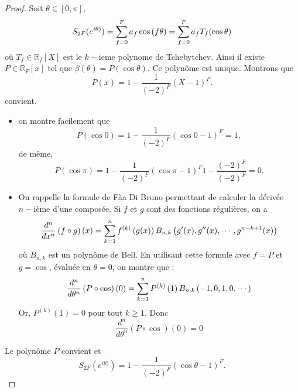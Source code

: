 \begin{proof}
Soit $\theta \in [0, \pi]$, 
\begin{equation}
S_{2F}(e^{i\theta)}) = \displaystyle\sum\limits_{f=0}^F a_f \cos \left( f \theta \right) = \displaystyle\sum\limits_{f=0}^F a_f T_f ( \cos \theta )
\end{equation}
où $T_f \in \mathbb{R}_f [X]$ est le $k-$ieme polynome de Tchebytchev. 
Ainsi il existe $P \in \mathbb{R}_F [x]$ tel que $\beta( \theta ) = P( \cos \theta )$. Ce polynôme est unique. Montrons que 
\begin{equation}
P(x) = 1 -\dfrac{1}{(-2)^F} (X - 1)^F.
\end{equation}
convient.

\begin{itemize}
\item on montre facilement que 
\begin{equation}
P( \cos 0 ) = 1 -\dfrac{1}{(-2)^F} (\cos 0 - 1)^F = 1,
\end{equation}
de même,
\begin{equation}
P( \cos \pi ) = 1 -\dfrac{1}{(-2)^F} (\cos \pi - 1)^F 1 -\dfrac{(-2)^F}{(-2)^F} = 0.
\end{equation}
\item On rappelle la formule de Fàa Di Bruno permettant de calculer la dérivée $n-$ième d'une composée. Si $f$ et $g$ sont des fonctions régulières, on a 
\begin{equation}
\dfrac{d^n}{dx^n} \left( f \circ g \right)(x) = \displaystyle\sum\limits_{k=1}^n f^{(k)}\left( g(x) \right) B_{n,k}\left( g'(x), g''(x), \cdots , g^{n-k+1}(x) \right)
\end{equation}
où $B_{n,k}$ est un polynôme de Bell. En utilisant cette formule avec $f = P$ et $g = \cos$, évaluée en $\theta = 0$, on montre que :
\begin{equation}
\dfrac{d^n}{d\theta^n} \left( P \circ \cos \right)(0) = \displaystyle\sum\limits_{k=1}^n P^{(k)}\left(1\right) B_{n,k}\left( -1,0,1,0, \cdots\right)
\end{equation}
Or, $P^{(k)}\left(1\right) = 0$ pour tout $k \geq 1$. Donc 
\begin{equation}
\dfrac{d^n}{d\theta^n} \left( P \circ \cos \right)(0) = 0
\end{equation}
\end{itemize}
Le polynôme $P$ convient et 
\begin{equation}
S_{2F}(e^{i\theta)}) = 1 - \dfrac{1}{(-2)^F}(\cos \theta -1)^F.
\end{equation}
\end{proof}

